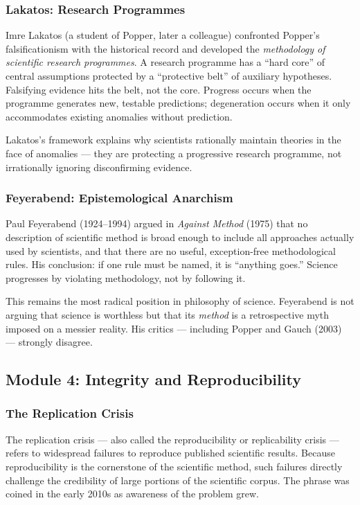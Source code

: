 \documentclass[11pt,letterpaper]{article}
\begin{document}
\subsubsection{Lakatos: Research Programmes}

Imre Lakatos (a student of Popper, later a colleague) confronted Popper's falsificationism with the historical record and developed the \emph{methodology of scientific research programmes}. A research programme has a ``hard core'' of central assumptions protected by a ``protective belt'' of auxiliary hypotheses. Falsifying evidence hits the belt, not the core. Progress occurs when the programme generates new, testable predictions; degeneration occurs when it only accommodates existing anomalies without prediction.

Lakatos's framework explains why scientists rationally maintain theories in the face of anomalies --- they are protecting a progressive research programme, not irrationally ignoring disconfirming evidence.

\subsubsection{Feyerabend: Epistemological Anarchism}

Paul Feyerabend (1924--1994) argued in \emph{Against Method} (1975) that no description of scientific method is broad enough to include all approaches actually used by scientists, and that there are no useful, exception-free methodological rules. His conclusion: if one rule must be named, it is ``anything goes.'' Science progresses by violating methodology, not by following it.

This remains the most radical position in philosophy of science. Feyerabend is not arguing that science is worthless but that its \emph{method} is a retrospective myth imposed on a messier reality. His critics --- including Popper and Gauch (2003) --- strongly disagree.

\subsection{Module 4: Integrity and Reproducibility}

\subsubsection{The Replication Crisis}

The replication crisis --- also called the reproducibility or replicability crisis --- refers to widespread failures to reproduce published scientific results. Because reproducibility is the cornerstone of the scientific method, such failures directly challenge the credibility of large portions of the scientific corpus. The phrase was coined in the early 2010s as awareness of the problem grew.
\end{document}
